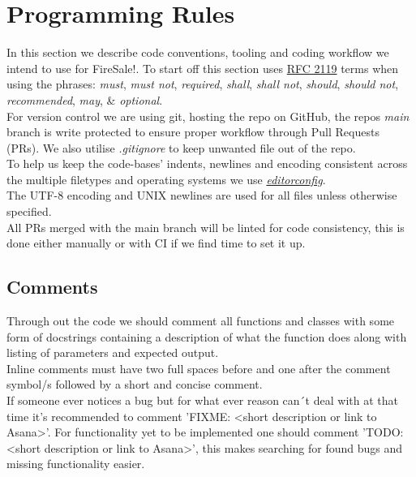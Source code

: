 \section{Programming Rules}

In this section we describe code conventions, tooling and coding workflow we intend to use for FireSale!. To start off this section uses \href{https://datatracker.ietf.org/doc/html/rfc2119}{RFC 2119} 
terms when using the phrases: \textit{must}, \textit{must not}, \textit{required}, \textit{shall}, \textit{shall not}, \textit{should}, \textit{should not}, \textit{recommended}, \textit{may}, \& \textit{optional}.\\
 
For version control we are using git, hosting the repo on GitHub, the repos \textit{main} branch is write protected to ensure proper workflow through Pull Requests (PRs). We also utilise \textit{.gitignore} to keep unwanted file out of the repo.\\

To help us keep the code-bases' indents, newlines and encoding consistent across the multiple filetypes and operating systems we use \href{https://editorconfig.org}{\textit{editorconfig}}.\\

The UTF-8 encoding and UNIX newlines are used for all files unless otherwise specified.\\

All PRs merged with the main branch will be linted for code consistency, this is done either manually or with CI if we find time to set it up.

\subsection{Comments}
Through out the code we should comment all functions and classes with some form of docstrings containing a description of what the function does along with listing of parameters and expected output.\\

Inline comments must have two full spaces before and one after the comment symbol/s followed by a short and concise comment.\\

If someone ever notices a bug but for what ever reason can´t deal with at that time it's recommended to comment 'FIXME: <short description or link to Asana>'. For functionality yet to be implemented one should comment 'TODO: <short description or link to Asana>', this makes searching for found bugs and missing functionality easier.\\

